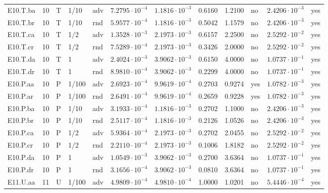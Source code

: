 {\begin{longtable}{@{}lllllllllll l@{}}
E10.T.ba & 10 & T & 1/10 & adv & $7.2795\cdot 10^{-4}$ & $1.1816\cdot 10^{-3}$ & 0.6160 & 1.2100 & no & $2.4206\cdot 10^{-3}$ & yes \\
E10.T.br & 10 & T & 1/10 & rnd & $5.9577\cdot 10^{-4}$ & $1.1816\cdot 10^{-3}$ & 0.5042 & 1.1579 & no & $2.4206\cdot 10^{-3}$ & yes \\
E10.T.ca & 10 & T & 1/2 & adv & $1.3528\cdot 10^{-3}$ & $2.1973\cdot 10^{-3}$ & 0.6157 & 2.2500 & no & $2.5292\cdot 10^{-2}$ & yes \\
E10.T.cr & 10 & T & 1/2 & rnd & $7.5289\cdot 10^{-4}$ & $2.1973\cdot 10^{-3}$ & 0.3426 & 2.0000 & no & $2.5292\cdot 10^{-2}$ & yes \\
E10.T.da & 10 & T & 1 & adv & $2.4024\cdot 10^{-3}$ & $3.9062\cdot 10^{-3}$ & 0.6150 & 4.0000 & no & $1.0737\cdot 10^{-1}$ & yes \\
E10.T.dr & 10 & T & 1 & rnd & $8.9810\cdot 10^{-4}$ & $3.9062\cdot 10^{-3}$ & 0.2299 & 4.0000 & no & $1.0737\cdot 10^{-1}$ & yes \\
E10.P.aa & 10 & P & 1/100 & adv & $2.6923\cdot 10^{-4}$ & $9.9619\cdot 10^{-4}$ & 0.2703 & 0.9274 & yes & $1.0782\cdot 10^{-3}$ & yes \\
E10.P.ar & 10 & P & 1/100 & rnd & $2.6491\cdot 10^{-4}$ & $9.9619\cdot 10^{-4}$ & 0.2659 & 0.9228 & yes & $1.0782\cdot 10^{-3}$ & yes \\
E10.P.ba & 10 & P & 1/10 & adv & $3.1933\cdot 10^{-4}$ & $1.1816\cdot 10^{-3}$ & 0.2702 & 1.1000 & no & $2.4206\cdot 10^{-3}$ & yes \\
E10.P.br & 10 & P & 1/10 & rnd & $2.5117\cdot 10^{-4}$ & $1.1816\cdot 10^{-3}$ & 0.2126 & 1.0526 & no & $2.4206\cdot 10^{-3}$ & yes \\
E10.P.ca & 10 & P & 1/2 & adv & $5.9364\cdot 10^{-4}$ & $2.1973\cdot 10^{-3}$ & 0.2702 & 2.0455 & no & $2.5292\cdot 10^{-2}$ & yes \\
E10.P.cr & 10 & P & 1/2 & rnd & $2.2110\cdot 10^{-4}$ & $2.1973\cdot 10^{-3}$ & 0.1006 & 1.8182 & no & $2.5292\cdot 10^{-2}$ & yes \\
E10.P.da & 10 & P & 1 & adv & $1.0549\cdot 10^{-3}$ & $3.9062\cdot 10^{-3}$ & 0.2700 & 3.6364 & no & $1.0737\cdot 10^{-1}$ & yes \\
E10.P.dr & 10 & P & 1 & rnd & $3.1656\cdot 10^{-4}$ & $3.9062\cdot 10^{-3}$ & 0.0810 & 3.6364 & no & $1.0737\cdot 10^{-1}$ & yes \\
E11.U.aa & 11 & U & 1/100 & adv & $4.9809\cdot 10^{-4}$ & $4.9810\cdot 10^{-4}$ & 1.0000 & 1.0201 & no & $5.4446\cdot 10^{-4}$ & yes \\

\end{longtable}}
